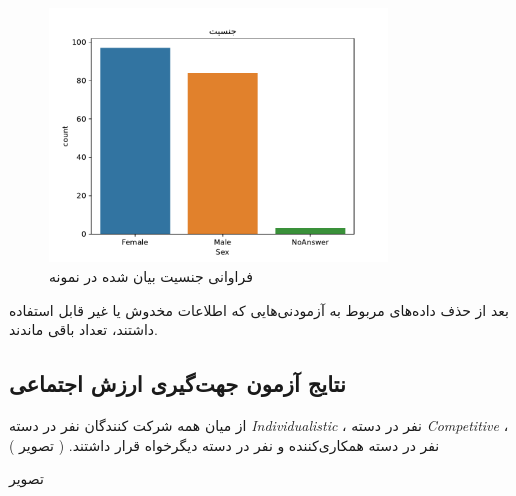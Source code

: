 
% 
\begin{figure}[htpb]
    \centering
    \includegraphics[width=0.8\textwidth]{./img/sexualityAgainstPopulation.pdf}
    \caption{فراوانی جنسیت بیان شده در نمونه}
    \label{fig:sexualityAgainstPopulation}
\end{figure}
بعد از حذف داده‌های مربوط به آزمودنی‌هایی که اطلاعات مخدوش یا غیر قابل استفاده داشتند، تعداد
\CleanedSampleSize
باقی ماندند.

\subsection{نتایج آزمون جهت‌گیری ارزش اجتماعی}
از میان همه شرکت کنندگان
\noOfIndividualisticParticipants
نفر در دسته
\textit{
    \gls{Individualistic}
}
،
\noOfCompetitiveParticipants
نفر در دسته
\textit{
    \gls{Competitive}
}
،
\noOfCooperativeParticipants
نفر در دسته
همکاری‌کننده
و
\noOfAltruisticParticipants
نفر در دسته
دیگر‌خواه
قرار داشتند.
(
تصویر \label{fig:SVOAgainstPopulation}
)

تصویر \label{fig:sexualityAndSVOAgainstPopulation}

